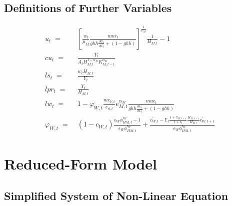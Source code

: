 \documentclass[12pt,3p,authoryear,review]{elsarticle}
\begin{document}
\subsection{Definitions of Further Variables}\label{sec:add_further_variables}%
\vspace{-0.2in}%
\begin{align}%
	u_t \; = & \; \left[ \frac{w_t}{\mu_M} \frac{muc_t}{ghh\frac{\partial\mathbb{U}_t}{\partial C_t}+\left(1-ghh\right)} \right]^{\frac{1}{\nu_M}} \frac{1}{H_{M,t}} - 1\\%
	cu_t \; = & \; \frac{Y_t}{A_t H_{M,t}^{1-\alpha_M} K_{M,t-1}^{\alpha_M}}\\%
	ls_t \; = & \; \frac{w_t H_{M,t}}{Y_t}\\%
	lpr_t \; = & \; \frac{Y_t}{H_{M,t}}\\%
	lw_t \; = & \; 1 - \varphi_{W,t} \frac{mc_{Y,t}}{e_{S,t}} e_{M,t}^{\alpha_M} \frac{muc_t}{ghh\frac{\partial\mathbb{U}_t}{\partial C_t}+(1-ghh)}\\%
	\varphi_{W,t} \; = & \; (1-c_{W,t}) \frac{\epsilon_W \phi_{HM,t}^{\epsilon_W}-1}{\epsilon_W \phi_{HM,t}^{\epsilon_W}} + \frac{c^{\prime}_{W,t} - \mathbb{E}_t\frac{1+\pi_{W,t+1}}{1+r_t}\frac{H_{M,t+1}}{H_{M,t}}c^{\prime}_{W,t+1}}{\epsilon_W \phi_{HM,t}^{\epsilon_W}}%
\end{align}%
\pagebreak%
\section{Reduced-Form Model}\label{sec:reduced_form_app}%
\subsection{Simplified System of Non-Linear Equation}%
\end{document}

